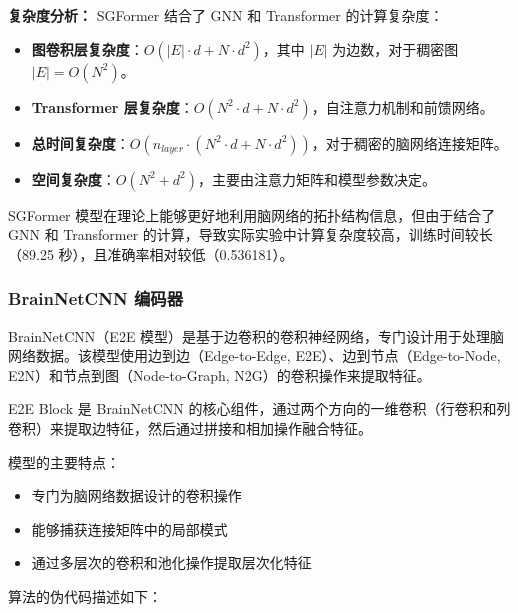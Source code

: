 \documentclass[12pt,a4paper]{article}
\begin{document}
\textbf{复杂度分析：}
SGFormer 结合了 GNN 和 Transformer 的计算复杂度：
\begin{itemize}
\item \textbf{图卷积层复杂度}：$O(|E| \cdot d + N \cdot d^2)$，其中 $|E|$ 为边数，对于稠密图 $|E| = O(N^2)$。
\item \textbf{Transformer 层复杂度}：$O(N^2 \cdot d + N \cdot d^2)$，自注意力机制和前馈网络。
\item \textbf{总时间复杂度}：$O(n_{layer} \cdot (N^2 \cdot d + N \cdot d^2))$，对于稠密的脑网络连接矩阵。
\item \textbf{空间复杂度}：$O(N^2 + d^2)$，主要由注意力矩阵和模型参数决定。
\end{itemize}

SGFormer 模型在理论上能够更好地利用脑网络的拓扑结构信息，但由于结合了 GNN 和 Transformer 的计算，导致实际实验中计算复杂度较高，训练时间较长（89.25 秒），且准确率相对较低（0.536181）。

\subsubsection{BrainNetCNN 编码器}

BrainNetCNN（E2E 模型）是基于边卷积的卷积神经网络，专门设计用于处理脑网络数据。该模型使用边到边（Edge-to-Edge, E2E）、边到节点（Edge-to-Node, E2N）和节点到图（Node-to-Graph, N2G）的卷积操作来提取特征。

E2E Block 是 BrainNetCNN 的核心组件，通过两个方向的一维卷积（行卷积和列卷积）来提取边特征，然后通过拼接和相加操作融合特征。

模型的主要特点：
\begin{itemize}
\item 专门为脑网络数据设计的卷积操作
\item 能够捕获连接矩阵中的局部模式
\item 通过多层次的卷积和池化操作提取层次化特征
\end{itemize}

算法的伪代码描述如下：
\end{document}
